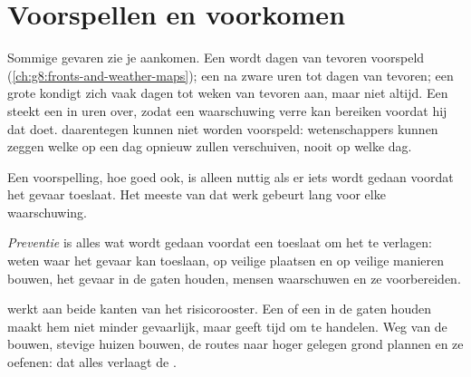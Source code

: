\section{Voorspellen en voorkomen}

Sommige gevaren zie je aankomen. Een  wordt dagen van tevoren
voorspeld (\cref{ch:g8:fronts-and-weather-maps}); een  na
zware  uren tot dagen van tevoren; een grote  kondigt
zich vaak dagen tot weken van tevoren aan, maar niet altijd. Een 
steekt een  in uren over, zodat een waarschuwing verre  kan
bereiken voordat hij dat doet.  daarentegen kunnen niet worden
voorspeld: wetenschappers kunnen zeggen welke  op een dag opnieuw
zullen verschuiven, nooit op welke dag.

Een voorspelling, hoe goed ook, is alleen nuttig als er iets wordt gedaan
voordat het gevaar toeslaat. Het meeste van dat werk gebeurt lang voor
elke waarschuwing.

\begin{definition}[Preventie]\label{def:g9:natural-risks:prevention}
\emph{Preventie} is alles wat wordt gedaan voordat een
 toeslaat om het  te verlagen: weten waar het gevaar kan
toeslaan, op veilige plaatsen en op veilige manieren bouwen, het gevaar in
de gaten houden, mensen waarschuwen en ze voorbereiden.
\end{definition}

 werkt aan beide kanten van het risicorooster. Een  of
een  in de gaten houden maakt hem niet minder gevaarlijk, maar geeft
tijd om te handelen. Weg van de  bouwen, stevige
huizen bouwen, de routes naar hoger gelegen grond plannen en ze oefenen:
dat alles verlaagt de .


